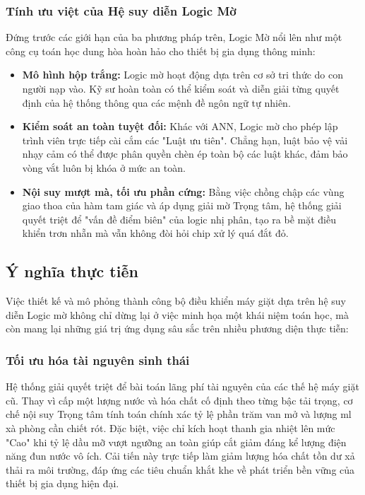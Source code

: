 \documentclass[12pt, a4paper]{article}
\begin{document}
\subsubsection{Tính ưu việt của Hệ suy diễn Logic Mờ}
Đứng trước các giới hạn của ba phương pháp trên, Logic Mờ nổi lên như một công cụ toán học dung hòa hoàn hảo cho thiết bị gia dụng thông minh:
\begin{itemize}
    \item \textbf{Mô hình hộp trắng:} Logic mờ hoạt động dựa trên cơ sở tri thức do con người nạp vào. Kỹ sư hoàn toàn có thể kiểm soát và diễn giải từng quyết định của hệ thống thông qua các mệnh đề ngôn ngữ tự nhiên.
    \item \textbf{Kiểm soát an toàn tuyệt đối:} Khác với ANN, Logic mờ cho phép lập trình viên trực tiếp cài cắm các "Luật ưu tiên". Chẳng hạn, luật bảo vệ vải nhạy cảm có thể được phân quyền chèn ép toàn bộ các luật khác, đảm bảo vòng vắt luôn bị khóa ở mức an toàn.
    \item \textbf{Nội suy mượt mà, tối ưu phần cứng:} Bằng việc chồng chập các vùng giao thoa của hàm tam giác và áp dụng giải mờ Trọng tâm, hệ thống giải quyết triệt để "vấn đề điểm biên" của logic nhị phân, tạo ra bề mặt điều khiển trơn nhẵn mà vẫn không đòi hỏi chip xử lý quá đắt đỏ.
\end{itemize}

\subsection{Ý nghĩa thực tiễn}
Việc thiết kế và mô phỏng thành công bộ điều khiển máy giặt dựa trên hệ suy diễn Logic mờ không chỉ dừng lại ở việc minh họa một khái niệm toán học, mà còn mang lại những giá trị ứng dụng sâu sắc trên nhiều phương diện thực tiễn:

\subsubsection{Tối ưu hóa tài nguyên sinh thái}
Hệ thống giải quyết triệt để bài toán lãng phí tài nguyên của các thế hệ máy giặt cũ. Thay vì cấp một lượng nước và hóa chất cố định theo từng bậc tải trọng, cơ chế nội suy Trọng tâm tính toán chính xác tỷ lệ phần trăm van mở và lượng ml xà phòng cần chiết rót. Đặc biệt, việc chỉ kích hoạt thanh gia nhiệt lên mức "Cao" khi tỷ lệ dầu mỡ vượt ngưỡng an toàn giúp cắt giảm đáng kể lượng điện năng đun nước vô ích. Cải tiến này trực tiếp làm giảm lượng hóa chất tồn dư xả thải ra môi trường, đáp ứng các tiêu chuẩn khắt khe về phát triển bền vững của thiết bị gia dụng hiện đại.
\end{document}
